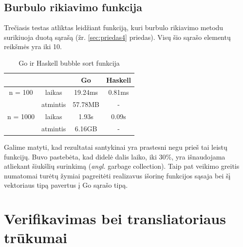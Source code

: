 \documentclass{VUMIFPSkursinis}
\begin{document}
\subsection{Burbulo rikiavimo funkcija}
Trečiasis testas atliktas leidžiant funkciją, kuri burbulo rikiavimo metodu surikiuoja duotą sąrašą (žr. \ref{sec:priedas4} priedas). Visų šio sąrašo elementų reikšmės yra iki 10.
			\begin{center}
				\centering
				\begin{table}[H]
					\caption{Go ir Haskell bubble sort funkcija}
					\centering
				\begin{tabular}{ cccc } 
				& & \textbf{Go} & \textbf{Haskell}  \\
				\midrule
				n = 100 & laikas & 19.24ms & 0.81ms    \\
				 & atmintis & 57.78MB & -  \\
				\midrule
				n = 1000 & laikas & 1.93s & 0.09s  \\
				 & atmintis & 6.16GB & - \\
				\midrule
				\end{tabular}
				\centering
			\end{table}
				\end{center}
Galime matyti, kad rezultatai santykinai yra prastesni negu prieš tai leistų funkcijų. Buvo pastebėta, kad didelė dalis laiko, iki 30\%, yra išnaudojama atliekant šiukšlių surinkimą (\textit{angl.} garbage collection). Taip pat veikimo greitis numatomai turėtų žymiai pagreitėti realizavus išorinę funkcijos sąsaja bei šį vektoriaus tipą pavertus į Go sąrašo tipą.
\section{Verifikavimas bei transliatoriaus trūkumai}
\end{document}
